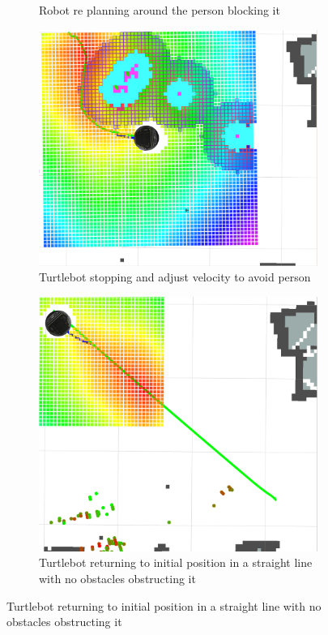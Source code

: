 \begin{figure}[h!]
\begin{subfigure}[b]{0.49\linewidth}
    \caption{Robot re planning around the person blocking it}
    \label{fig::radarperson2}
  \end{subfigure}
  \begin{subfigure}[b]{0.49\linewidth}
    \includegraphics[width=\linewidth]{imgs/chapter5/radarperson3.png}
    \caption{Turtlebot stopping and adjust velocity to avoid person}
    \label{fig::radarperson3}
  \end{subfigure}
  \begin{subfigure}[b]{0.49\linewidth}
    \includegraphics[width=\linewidth]{imgs/chapter5/radarperson4.png}
    \caption{Turtlebot returning to initial position in a straight line with no obstacles obstructing it}
    \label{fig::radarperson4}
  \end{subfigure}
\end{figure}
